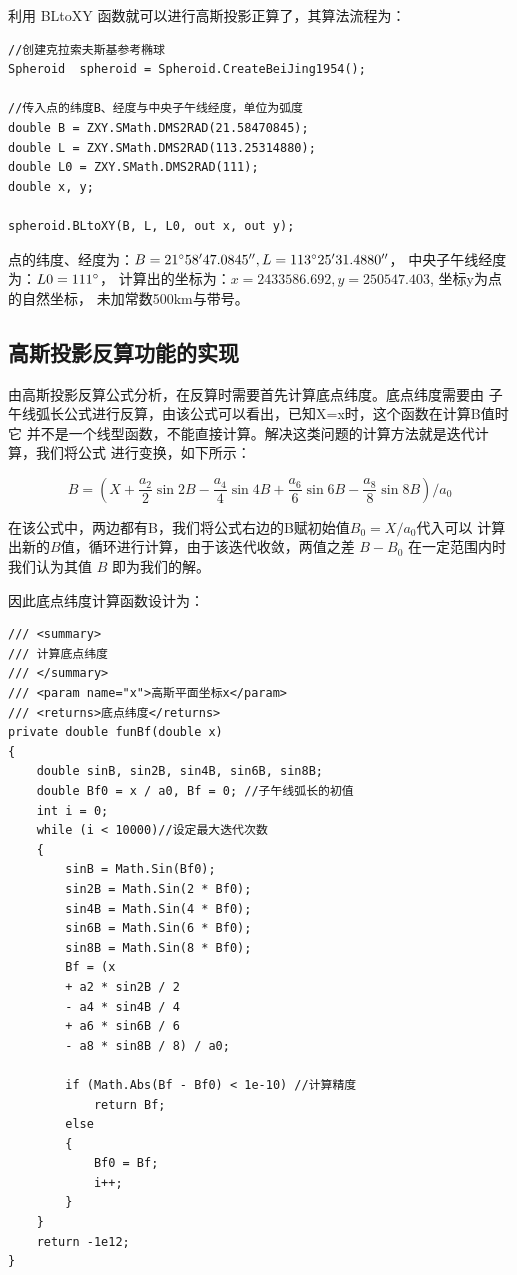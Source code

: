 利用 BLtoXY 函数就可以进行高斯投影正算了，其算法流程为：

\begin{lstlisting}
//创建克拉索夫斯基参考椭球
Spheroid  spheroid = Spheroid.CreateBeiJing1954();

//传入点的纬度B、经度与中央子午线经度，单位为弧度
double B = ZXY.SMath.DMS2RAD(21.58470845);
double L = ZXY.SMath.DMS2RAD(113.25314880);
double L0 = ZXY.SMath.DMS2RAD(111);
double x, y;

spheroid.BLtoXY(B, L, L0, out x, out y);
\end{lstlisting}

点的纬度、经度为：$ B = 21 ^\circ 58'47.0845'',  L= 113^\circ 25'31.4880''$，
中央子午线经度为：$L0 = 111^\circ$，
计算出的坐标为：$x=2433586.692, y=250547.403$, 坐标y为点的自然坐标，
未加常数500km与带号。

\subsection{高斯投影反算功能的实现}
由高斯投影反算公式分析，在反算时需要首先计算底点纬度。底点纬度需要由
子午线弧长公式进行反算，由该公式可以看出，已知X=x时，这个函数在计算B值时它
并不是一个线型函数，不能直接计算。解决这类问题的计算方法就是迭代计算，我们将公式
进行变换，如下所示：

$$B= (X + \frac{a_2}{2}\sin 2B - \frac{a_4}{4}\sin 4B
    + \frac{a_6}{6} \sin 6B  - \frac{a_8}{8}\sin 8B)/a_0$$

在该公式中，两边都有B，我们将公式右边的B赋初始值$B_0=X/a_0$代入可以
计算出新的$B$值，循环进行计算，由于该迭代收敛，两值之差 $B - B_0$ 在一定范围内时
我们认为其值 $B$ 即为我们的解。

因此底点纬度计算函数设计为：

\begin{lstlisting}
/// <summary>
/// 计算底点纬度
/// </summary>
/// <param name="x">高斯平面坐标x</param>
/// <returns>底点纬度</returns>
private double funBf(double x)
{
    double sinB, sin2B, sin4B, sin6B, sin8B;
    double Bf0 = x / a0, Bf = 0; //子午线弧长的初值
    int i = 0;
    while (i < 10000)//设定最大迭代次数
    {
        sinB = Math.Sin(Bf0);
        sin2B = Math.Sin(2 * Bf0);
        sin4B = Math.Sin(4 * Bf0);
        sin6B = Math.Sin(6 * Bf0);
        sin8B = Math.Sin(8 * Bf0);
        Bf = (x
        + a2 * sin2B / 2
        - a4 * sin4B / 4
        + a6 * sin6B / 6
        - a8 * sin8B / 8) / a0;

        if (Math.Abs(Bf - Bf0) < 1e-10) //计算精度
            return Bf;
        else
        {
            Bf0 = Bf;
            i++;
        }
    }
    return -1e12;
}
\end{lstlisting}

